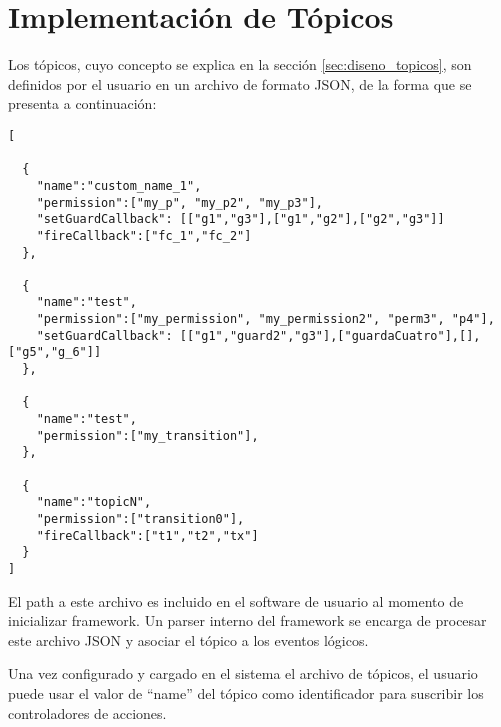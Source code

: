 \section{Implementación de Tópicos}
Los tópicos, cuyo concepto se explica en la sección \ref{sec:diseno_topicos}, son definidos
por el usuario en un archivo de formato JSON, de la forma que se presenta a
continuación:
\begin{verbatim}
[

  {
    "name":"custom_name_1",
    "permission":["my_p", "my_p2", "my_p3"],
    "setGuardCallback": [["g1","g3"],["g1","g2"],["g2","g3"]]
    "fireCallback":["fc_1","fc_2"]
  },
  
  {
    "name":"test",
    "permission":["my_permission", "my_permission2", "perm3", "p4"],
    "setGuardCallback": [["g1","guard2","g3"],["guardaCuatro"],[],["g5","g_6"]] 
  },
  
  {
    "name":"test",
    "permission":["my_transition"],
  },
  
  {
    "name":"topicN",
    "permission":["transition0"],
    "fireCallback":["t1","t2","tx"]
  }
]
\end{verbatim}

El path a este archivo es incluido en el software de usuario al momento de
inicializar \nombreFramework framework. Un parser interno del framework se
encarga de procesar este archivo JSON y asociar el tópico a los eventos
lógicos.

Una vez configurado y cargado en el sistema el archivo de tópicos, el usuario
puede usar el valor de ``name'' del tópico como identificador para suscribir
los controladores de acciones.
